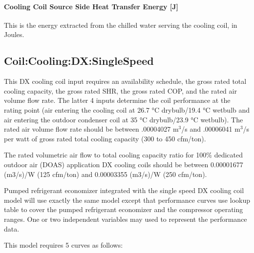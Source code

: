 \paragraph{Cooling Coil Source Side Heat Transfer Energy {[}J{]}}\label{cooling-coil-source-side-heat-transfer-energy-j-1}

This is the energy extracted from the chilled water serving the cooling coil, in Joules.

\subsection{Coil:Cooling:DX:SingleSpeed}\label{coilcoolingdxsinglespeed}

This DX cooling coil input requires an availability schedule, the gross rated total cooling capacity, the gross rated SHR, the gross rated COP, and the rated air volume flow rate. The latter 4 inputs determine the coil performance at the rating point (air entering the cooling coil at 26.7 °C drybulb/19.4 °C wetbulb and air entering the outdoor condenser coil at 35 °C drybulb/23.9 °C wetbulb). The rated air volume flow rate should be between .00004027 m\(^{3}\)/s and .00006041 m\(^{3}\)/s per watt of gross rated total cooling capacity (300 to 450 cfm/ton).

The rated volumetric air flow to total cooling capacity ratio for 100\% dedicated outdoor air (DOAS) application DX cooling coils should be between 0.00001677 (m3/s)/W (125 cfm/ton) and 0.00003355 (m3/s)/W (250 cfm/ton).

Pumped refrigerant economizer integrated with the single speed DX cooling coil model will use exactly the same model except that performance curves use lookup table to cover the pumped refrigerant economizer and the compressor operating ranges. One or two independent variables may used to represent the performance data.

This model requires 5 curves as follows:

